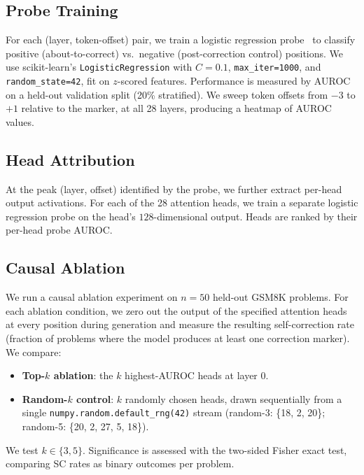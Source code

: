 \documentclass{article}
\begin{document}
\subsection{Probe Training}
\label{sec:probe}

For each (layer, token-offset) pair, we train a logistic regression probe~\citep{zou2023representation} to classify positive (about-to-correct) vs.\ negative (post-correction control) positions.
We use scikit-learn's \texttt{LogisticRegression} with $C = 0.1$, \texttt{max\_iter=1000}, and \texttt{random\_state=42}, fit on $z$-scored features.
Performance is measured by AUROC on a held-out validation split (20\% stratified).
We sweep token offsets from $-3$ to $+1$ relative to the marker, at all 28 layers, producing a heatmap of AUROC values.

\subsection{Head Attribution}
\label{sec:attribution}

At the peak (layer, offset) identified by the probe, we further extract per-head output activations.
For each of the 28 attention heads, we train a separate logistic regression probe on the head's $128$-dimensional output.
Heads are ranked by their per-head probe AUROC.

\subsection{Causal Ablation}
\label{sec:ablation}

We run a causal ablation experiment on $n = 50$ held-out GSM8K problems.
For each ablation condition, we zero out the output of the specified attention heads at every position during generation and measure the resulting self-correction rate (fraction of problems where the model produces at least one correction marker).
We compare:
\begin{itemize}
  \item \textbf{Top-$k$ ablation}: the $k$ highest-AUROC heads at layer 0.
  \item \textbf{Random-$k$ control}: $k$ randomly chosen heads, drawn sequentially from a single \texttt{numpy.random.default\_rng(42)} stream (random-3: \{18, 2, 20\}; random-5: \{20, 2, 27, 5, 18\}).
\end{itemize}
We test $k \in \{3, 5\}$.
Significance is assessed with the two-sided Fisher exact test, comparing SC rates as binary outcomes per problem.
\end{document}
